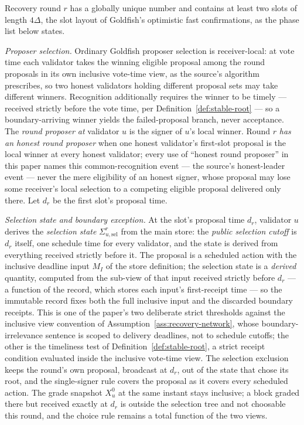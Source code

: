 \begin{definition}\label{def:recovery-timing}
Recovery round \(r\) has a globally unique number and contains at least two
slots of length \(4\Delta\), the slot layout of Goldfish's optimistic
fast confirmations, as the phase list below states.

\emph{Proposer selection.}
Ordinary Goldfish proposer selection is receiver-local: at vote time
each validator takes the winning eligible proposal among the round
proposals in its own inclusive vote-time view, as the source's
algorithm prescribes, so two honest validators holding different
proposal sets may take different winners.  Recognition additionally
requires the winner to be timely --- received strictly before the vote
time, per Definition~\ref{def:stable-root} --- so a boundary-arriving
winner yields the failed-proposal branch, never acceptance.  The \emph{round
proposer at} validator \(u\) is the signer of \(u\)'s local winner.
Round \(r\) \emph{has an honest round proposer} when one honest
validator's first-slot proposal is the local winner at every honest
validator; every use of ``honest round proposer'' in this paper names
this common-recognition event --- the source's honest-leader event ---
never the mere eligibility of an honest signer, whose proposal may lose
some receiver's local selection to a competing eligible proposal
delivered only there.  Let \(d_r\) be the first slot's proposal time.

\emph{Selection state and boundary exception.}
At the slot's proposal time \(d_r\), validator \(u\) derives the
\emph{selection state} \(\Sigma_{u,\mathrm{sel}}^r\) from the main store:
the \emph{public selection cutoff} is \(d_r\) itself, one schedule time
for every validator, and the state is derived from everything received
strictly before it.  The proposal is a scheduled action with the
inclusive deadline input \(M_I\) of the store definition; the selection
state is a \emph{derived} quantity, computed from the sub-view of that
input received strictly before \(d_r\) --- a function of the record,
which stores each input's first-receipt time --- so the immutable
record fixes both the full inclusive input and the discarded boundary
receipts.  This is one of the paper's two deliberate strict thresholds
against the inclusive view convention of
Assumption~\ref{ass:recovery-network}, whose boundary-irrelevance
sentence is scoped to delivery deadlines, not to schedule cutoffs; the
other is the timeliness test of Definition~\ref{def:stable-root}, a
strict receipt condition evaluated inside the inclusive vote-time
view.  The selection exclusion keeps the round's own proposal,
broadcast at \(d_r\), out of the state that chose its root, and the
single-signer rule covers the proposal as it covers every scheduled
action.  The grade
snapshot \(X_u^0\) at the same instant stays inclusive; a block graded
there but received exactly at \(d_r\) is outside the selection tree and
not choosable this round, and the choice rule remains a total function
of the two views.


\end{definition}
